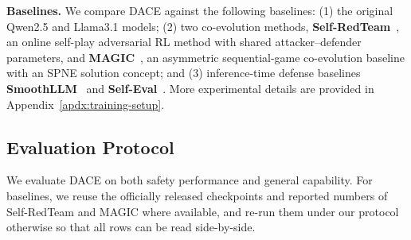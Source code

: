 \documentclass{article}
\newcommand{\method}{\textsc{DACE}\xspace}
\begin{document}
\textbf{Baselines.}\quad
We compare \method against the following baselines: (1) the original Qwen2.5 and Llama3.1 models; (2) two co-evolution methods, \textbf{Self-RedTeam}~\citep{liu2025chasing}, an online self-play adversarial RL method with shared attacker--defender parameters, and \textbf{MAGIC}~\citep{magic2025}, an asymmetric sequential-game co-evolution baseline with an SPNE solution concept; and (3) inference-time defense baselines \textbf{SmoothLLM}~\citep{robey2023smoothllm} and \textbf{Self-Eval}~\citep{phute2023llm}. More experimental details are provided in Appendix~\ref{apdx:training-setup}.


\subsection{Evaluation Protocol}
\label{sec:exp-eval-protocol}

We evaluate \method on both safety performance and general capability. For baselines, we reuse the officially released checkpoints and reported numbers of Self-RedTeam and MAGIC where available, and re-run them under our protocol otherwise so that all rows can be read side-by-side.
\end{document}

